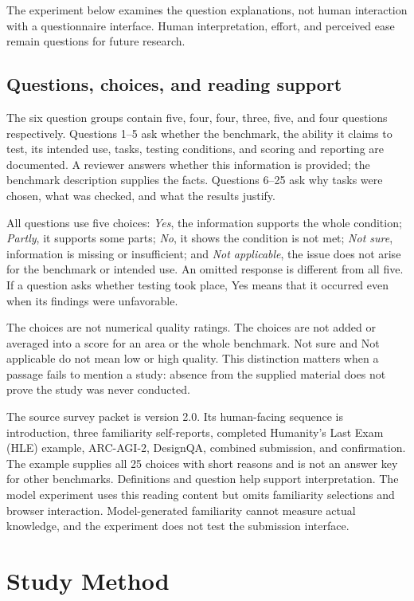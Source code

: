 \documentclass[10pt,conference]{IEEEtran}
\begin{document}
The experiment below examines the question explanations, not human interaction with a questionnaire interface. Human interpretation, effort, and perceived ease remain questions for future research.

\subsection{Questions, choices, and reading support}
The six question groups contain five, four, four, three, five, and four questions respectively. Questions 1--5 ask whether the benchmark, the ability it claims to test, its intended use, tasks, testing conditions, and scoring and reporting are documented. A reviewer answers whether this information is provided; the benchmark description supplies the facts. Questions 6--25 ask why tasks were chosen, what was checked, and what the results justify.

All questions use five choices: \emph{Yes}, the information supports the whole condition; \emph{Partly}, it supports some parts; \emph{No}, it shows the condition is not met; \emph{Not sure}, information is missing or insufficient; and \emph{Not applicable}, the issue does not arise for the benchmark or intended use. An omitted response is different from all five. If a question asks whether testing took place, Yes means that it occurred even when its findings were unfavorable.

The choices are not numerical quality ratings. The choices are not added or averaged into a score for an area or the whole benchmark. Not sure and Not applicable do not mean low or high quality. This distinction matters when a passage fails to mention a study: absence from the supplied material does not prove the study was never conducted.

The source survey packet is version 2.0. Its human-facing sequence is introduction, three familiarity self-reports, completed Humanity's Last Exam (HLE) example, ARC-AGI-2, DesignQA, combined submission, and confirmation. The example supplies all 25 choices with short reasons and is not an answer key for other benchmarks. Definitions and question help support interpretation. The model experiment uses this reading content but omits familiarity selections and browser interaction. Model-generated familiarity cannot measure actual knowledge, and the experiment does not test the submission interface.

\section{Study Method}
\end{document}
